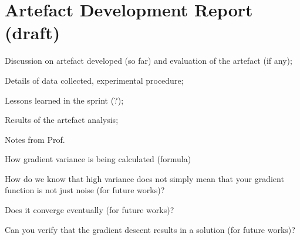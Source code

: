 \section{Artefact Development Report (draft)}
\begin{todolist}
    \item[\done] Discussion on artefact developed (so far) and evaluation of the artefact (if any);
    \item[\done] Details of data collected, experimental procedure;
    \item Lessons learned in the sprint (?);
    \item[\done] Results of the artefact analysis;
\end{todolist}

Notes from Prof.

\begin{todolist}
    \item[\done] How gradient variance is being calculated (formula)
    \item[\done] How do we know that high variance does not simply mean that your gradient function is not just noise (for future works)?
    \item Does it converge eventually (for future works)?
    \item Can you verify that the gradient descent results in a solution (for future works)?
\end{todolist}




